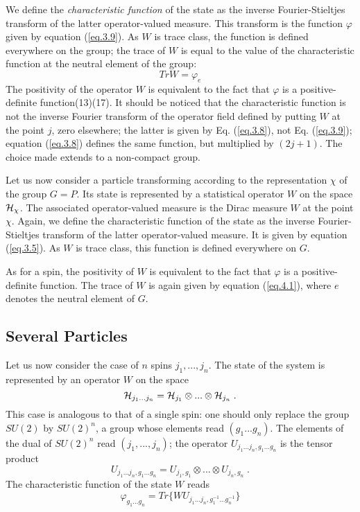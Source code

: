 \documentclass[a4paper,11pt]{article}
\begin{document}
We define the {\it characteristic function} of the state as the inverse Fourier-Stieltjes 
transform 
of the latter operator-valued measure. This transform is the function $\varphi$ given by 
equation 
(\ref{eq.3.9}). As $W$ is trace class, the function is defined everywhere on the group; the 
trace 
of $W$ is equal to the value of the characteristic function at the neutral element of the 
group:
\begin{equation}
 \label{eq.4.1}
  Tr W = \varphi_e
\end{equation}
The positivity of the operator $W$ is equivalent to the fact that $\varphi$ is a 
positive-definite function(13)(17). 
It should be noticed that the characteristic function is not the inverse Fourier transform of 
the operator field defined by putting $W$ at the point $j$, zero elsewhere; the latter is given 
by 
Eq. (\ref{eq.3.8}), not Eq. (\ref{eq.3.9}); equation (\ref{eq.3.8}) defines the same function, 
but multiplied by $(2j+1)$. The choice made extends to a non-compact group. 

Let us now consider a particle transforming according to the representation $\chi$ of the 
group $G=P$. Its state is represented by a statistical operator $W$ on the space $\mathcal{H}_{\chi}$. 
The associated 
operator-valued measure is the Dirac measure $W$ at the point $\chi$. Again, we define the 
characteristic function of the state as the inverse Fourier-Stieltjes transform of the latter 
operator-valued measure. It is given by equation (\ref{eq.3.5}). As $W$ is trace class, this 
function is defined everywhere on $G$. 

As for a spin, the positivity of $W$ is equivalent to the fact that $\varphi$ is a 
positive-definite 
function. The trace of $W$ is again given by equation (\ref{eq.4.1}), where $e$ denotes the 
neutral element of $G$.

\subsection{Several Particles}

Let us now consider the case of $n$ spins $j_1,...,j_n$. The state of the system is represented 
by 
an operator $W$ on the space
$$
   \mathcal{H}_{j_1 ... j_n} = \mathcal{H}_{j_1}\otimes ... \otimes \mathcal{H}_{j_n} \; .
$$
 This case is analogous to that of a single spin: one should only 
replace the group $SU(2)$ by $SU(2)^n$, a group whose elements read $(g_1... g_n)$. The 
elements of the dual of $SU(2)^n$ read $(j_1,..., j_n)$; the operator $U_{j_1 ... j_n,g_1 ... g_n}$
 is the tensor product
$$
   U_{j_1 ... j_n,g_1 ... g_n} = U_{j_1,g_1} \otimes ... \otimes U_{j_n,g_n}  \; .
$$
The characteristic function of the state $W$ reads
\begin{equation}
 \label{eq.4.2}
  \varphi_{g_1 ... g_n} = Tr \{ W  U_{j_1 ... j_n,g_1^{-1} ... g_n^{-1}} \}
\end{equation}
\end{document}
